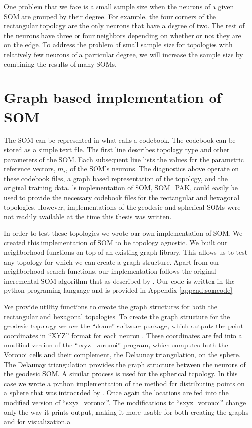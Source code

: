 One problem that we face is a small sample size when the neurons of a given
SOM are grouped by their degree.  For example, the four corners of the
rectangular topology are the only neurons that have a degree of two.  The rest
of the neurons have three or four neighbors depending on whether or not they
are on the edge. To address the problem of small sample size for topologies
with relatively few neurons of a particular degree, we will increase
the sample size by combining the results of many SOMs.

\section{Graph based implementation of SOM}
\label{meth:som}
The SOM can be represented in what \cite{kohonen1996} calls a codebook.  The
codebook can be stored as a simple text file.  The first line describes topology type and
other parameters of the SOM.  Each subsequent line lists the values for the
parametric reference vectors, $m_i$, of the SOM's neurons.  The diagnostics
above operate on these codebook files, a graph based representation of the
topology, and the original training data.  \citeauthor{kohonen1996}'s
implementation of SOM, SOM\_PAK, could easily be used to provide the necessary
codebook files for the rectangular and hexagonal topologies.  However, 
implementations of the geodesic and spherical SOMs were not readily available at the
time this thesis was written.

In order to test these topologies we wrote our own implementation of SOM.  We
created this implementation of SOM to be topology agnostic.  We built our
neighborhood functions on top of an existing graph library.  This allows us to
test any topology for which we can create a graph structure.  Apart from our
neighborhood search functions, our implementation follows the original
incremental SOM algorithm that as described by \cite{Kohonen2000}.  Our code
is written in the python programing language and is provided in Appendix
\ref{append:somcode}.

We provide utility functions to create the graph structures for both the
rectangular and hexagonal topologies.  To create the graph structure for the
geodesic topology we use the ``dome'' software package, which outputs the
point coordinates in ``XYZ'' format for each neuron \citep{dome}.  These
coordinates are fed into a modified version of the ``sxyz\_voronoi'' program,
which computes both the Voronoi cells and their complement, the Delaunay
triangulation, on the sphere\citep{Ranka97}.  The Delaunay triangulation provides the graph
structure between the neurons of the geodesic SOM.  A similar process is used
for the spherical topology. In this case we wrote a python implementation of
the method for distributing points on a sphere that was introcuded by
\cite{Rakhmanov94}.  Once again the locations are fed into the modified
version of ``sxyz\_voronoi''.  The modifications to ``sxyz\_voronoi'' change
only the way it prints output, making it more usable for both creating the
graphs and for visualization.a
